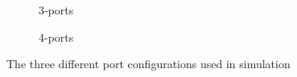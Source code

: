 \begin{figure}[H]
\begin{subfigure}[b]{0.31\textwidth}
		\caption{3-ports}
	\end{subfigure}
	\begin{subfigure}[b]{0.31\textwidth}
		\centering
		\caption{4-ports}
	\end{subfigure}
	\caption{The three different port configurations used in simulation}
	\label{fig:collective-behaviour}
\end{figure}


